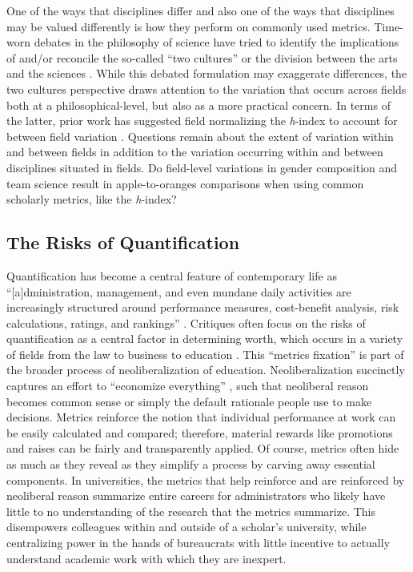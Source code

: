\documentclass[
  10pt,
  letterpaper,
]{article}
\begin{document}
One of the ways that disciplines differ and also one of the ways that
disciplines may be valued differently is how they perform on commonly
used metrics. Time-worn debates in the philosophy of science have tried
to identify the implications of and/or reconcile the so-called ``two
cultures'' or the division between the arts and the sciences
\citep{snow_two_2012}. While this debated formulation may exaggerate
differences, the two cultures perspective draws attention to the
variation that occurs across fields both at a philosophical-level, but
also as a more practical concern. In terms of the latter, prior work has
suggested field normalizing the \emph{h}-index to account for between
field variation \citep{bi_four_2023}. Questions remain about the extent
of variation within and between fields in addition to the variation
occurring within and between disciplines situated in fields. Do
field-level variations in gender composition and team science result in
apple-to-oranges comparisons when using common scholarly metrics, like
the \emph{h}-index?

\subsection{The Risks of
Quantification}\label{the-risks-of-quantification}

Quantification has become a central feature of contemporary life as
``{[}a{]}dministration, management, and even mundane daily activities
are increasingly structured around performance measures, cost-benefit
analysis, risk calculations, ratings, and rankings''
\citep[p.~224]{mennicken_what_2019}. Critiques often focus on the risks
of quantification as a central factor in determining worth, which occurs
in a variety of fields from the law to business to education
\citep[p.~4]{muller_tyranny_2019}. This ``metrics fixation'' is part of
the broader process of neoliberalization of education. Neoliberalization
succinctly captures an effort to ``economize everything''
\citep[p.~171]{berg_producing_2016}, such that neoliberal reason becomes
common sense or simply the default rationale people use to make
decisions. Metrics reinforce the notion that individual performance at
work can be easily calculated and compared; therefore, material rewards
like promotions and raises can be fairly and transparently applied. Of
course, metrics often hide as much as they reveal as they simplify a
process by carving away essential components. In universities, the
metrics that help reinforce and are reinforced by neoliberal reason
summarize entire careers for administrators who likely have little to no
understanding of the research that the metrics summarize. This
disempowers colleagues within and outside of a scholar's university,
while centralizing power in the hands of bureaucrats with little
incentive to actually understand academic work with which they are
inexpert.
\end{document}
